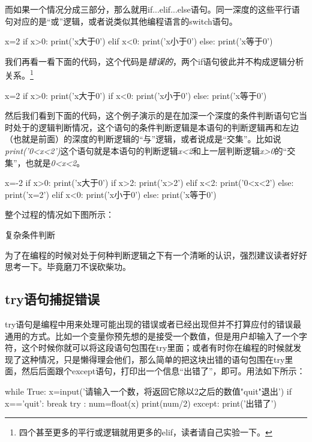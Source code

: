 \documentclass[12pt,oneside]{book}
\begin{document}
\begin{common-format}
而如果一个情况分成三部分，那么就用if...elif...else语句。同一深度的这些平行语句对应的是“或”逻辑，或者说类似其他编程语言的switch语句。
\begin{tcbpython}
x=2
if x>0:
    print('x大于0')
elif x<0:
    print('x小于0')
else:
    print('x等于0')
\end{tcbpython}

我们再看一看下面的代码，这个代码是\emph{错误的}，两个if语句彼此并不构成逻辑分析关系。\footnote{四个甚至更多的平行或逻辑就用更多的elif，读者请自己实验一下。}
\begin{tcbpython}
x=2
if x>0:
    print('x大于0')
if x<0:
    print('x小于0')
else:
    print('x等于0')
\end{tcbpython}


然后我们看到下面的代码，这个例子演示的是在加深一个深度的条件判断语句它当时处于的逻辑判断情况，这个语句的条件判断逻辑是本语句的判断逻辑再和左边（也就是前面）的深度的判断逻辑的“与”逻辑，或者说成是“交集”。比如说\textit{print('0<x<2')}这个语句就是本语句的判断逻辑\textit{x<2}和上一层判断逻辑\textit{x>0}的“交集”，也就是\textit{0<x<2}。

\begin{tcbpython}
x=-2
if x>0:
    print('x大于0')
    if x>2:
        print('x>2')
    elif x<2:
        print('0<x<2')
    else:
        print('x=2')
elif x<0:
    print('x小于0')
else:
    print('x等于0')
\end{tcbpython}


整个过程的情况如下图所示：
\begin{linefig}{复杂条件判断}
\caption{复杂条件判断}
\label{fig:复杂条件判断}
\end{linefig}
为了在编程的时候对处于何种判断逻辑之下有一个清晰的认识，强烈建议读者好好思考一下。毕竟磨刀不误砍柴功。





\subsection{try语句捕捉错误}
try语句是编程中用来处理可能出现的错误或者已经出现但并不打算应付的错误最通用的方式。比如一个变量你预先想的是接受一个数值，但是用户却输入了一个字符，这个时候你就可以将这段语句包围在try里面；或者有时你在编程的时候就发现了这种情况，只是懒得理会他们，那么简单的把这块出错的语句包围在try里面，然后后面跟个except语句，打印出一个信息“出错了”，即可。用法如下所示：
\begin{tcbpython}
while True:
    x=input('请输入一个数，将返回它除以2之后的数值"quit"退出\n')
    if x=='quit':
        break
    try :
        num=float(x)
        print(num/2)
    except:
        print('出错了')
\end{tcbpython}







\end{common-format}
\end{document}
